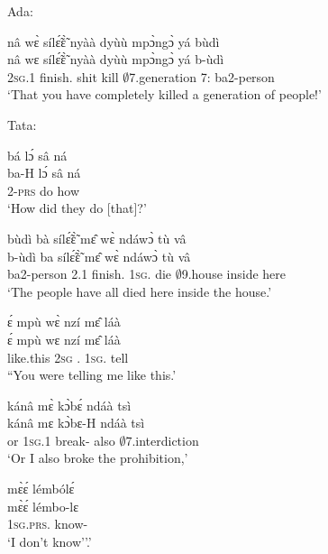 \noindent Ada:

\begin{exe}[(N234)] 
\exN\label{n217} 
  \glll nâ wɛ̀ sílɛ̃́ɛ̃̀ nyàà dyùù mpɔ̀ngɔ̀ yá bùdì\\
        nâ wɛ sílɛ̃́ɛ̃̀ nyàà dyùù mpɔ̀ngɔ̀ yá b-ùdì\\
         {\COMP} 2\textsc{sg}.{\PST}1 finish.{\COMPL} shit kill $\emptyset$7.generation 7:{\ATT}  ba2-person\\
    \trans `That you have completely killed a generation of people!'
\end{exe}

\noindent Tata:

\begin{exe}[(N234)]
\exN\label{n218}
  \glll bá lɔ́ sâ ná \\
        ba-H lɔ́ sâ ná \\
         2-\textsc{prs} {\RETRO}  do how \\
    \trans `How did they do [that]?'
 
\exN\label{n219}
  \glll bùdì bà sílɛ̃́ɛ̃̀ mɛ̂ wɛ̀ ndáwɔ̀ tù vâ \\
        b-ùdì ba sílɛ̃́ɛ̃̀ mɛ̂ wɛ̀ ndáwɔ̀ tù vâ \\
       ba2-person 2.{\PST}1 finish.{\COMPL} 1\textsc{sg}.{\OBJ} die $\emptyset$9.house inside here  \\
    \trans `The people have all died here inside the house.'
 
\exN\label{n220}
  \glll ɛ́ mpù wɛ̀ nzí mɛ̂ láà \\
       ɛ́ mpù wɛ nzí mɛ̂ láà \\
       {\LOC} like.this 2\textsc{sg} {\PROG}.{\PST}  1\textsc{sg}.{\OBJ} tell   \\
    \trans ``You were telling me like this.'
 
\exN\label{n221}
  \glll kánâ mɛ̀ kɔ̀bɛ́ ndáà tsì \\
        kánâ mɛ kɔ̀bɛ-H ndáà tsì \\
        or 1\textsc{sg}.{\PST}1 break-{\R} also $\emptyset$7.interdiction  \\
    \trans `Or I also broke the prohibition,'
 
\exN\label{n222}
  \glll mɛ̀ɛ́ lémbólɛ́ \\
        mɛ̀ɛ́ lémbo-lɛ \\
        1\textsc{sg}.\textsc{prs}.{\NEG} know-{\NEG}  \\
    \trans `I don't know''.'
 

\end{exe}
